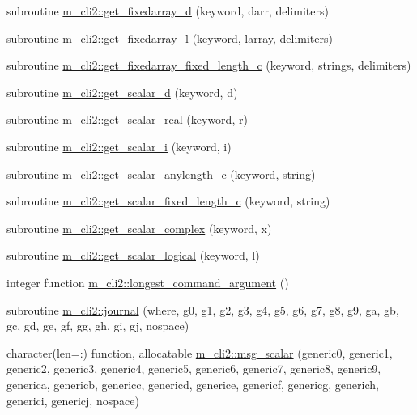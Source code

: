 \begin{DoxyCompactItemize}
\item 
subroutine \mbox{\hyperlink{namespacem__cli2_a2c8db0f383888cb2b3ce8643de3fae93}{m\+\_\+cli2\+::get\+\_\+fixedarray\+\_\+d}} (keyword, darr, delimiters)
\item 
subroutine \mbox{\hyperlink{namespacem__cli2_a65ffe8c7a444db5db3be3f6edecef008}{m\+\_\+cli2\+::get\+\_\+fixedarray\+\_\+l}} (keyword, larray, delimiters)
\item 
subroutine \mbox{\hyperlink{namespacem__cli2_a8000c5e05f6c84ba17350d4a00850a6a}{m\+\_\+cli2\+::get\+\_\+fixedarray\+\_\+fixed\+\_\+length\+\_\+c}} (keyword, strings, delimiters)
\item 
subroutine \mbox{\hyperlink{namespacem__cli2_a338757660adde093db76b7d5559a1906}{m\+\_\+cli2\+::get\+\_\+scalar\+\_\+d}} (keyword, d)
\item 
subroutine \mbox{\hyperlink{namespacem__cli2_ad089d91c66626de91bcda84523e80b54}{m\+\_\+cli2\+::get\+\_\+scalar\+\_\+real}} (keyword, r)
\item 
subroutine \mbox{\hyperlink{namespacem__cli2_a9c5208ef6763da7e68dd1e118bea0b7a}{m\+\_\+cli2\+::get\+\_\+scalar\+\_\+i}} (keyword, i)
\item 
subroutine \mbox{\hyperlink{namespacem__cli2_a7429381c83a021ba3ffb32ed58e17a0e}{m\+\_\+cli2\+::get\+\_\+scalar\+\_\+anylength\+\_\+c}} (keyword, string)
\item 
subroutine \mbox{\hyperlink{namespacem__cli2_a9dcc99d34db1771959a1461274ae073e}{m\+\_\+cli2\+::get\+\_\+scalar\+\_\+fixed\+\_\+length\+\_\+c}} (keyword, string)
\item 
subroutine \mbox{\hyperlink{namespacem__cli2_a2af4dd786acb5cb2dbd6e43667109490}{m\+\_\+cli2\+::get\+\_\+scalar\+\_\+complex}} (keyword, x)
\item 
subroutine \mbox{\hyperlink{namespacem__cli2_a138d07d14246ee532ce36e67719e8c7d}{m\+\_\+cli2\+::get\+\_\+scalar\+\_\+logical}} (keyword, l)
\item 
integer function \mbox{\hyperlink{namespacem__cli2_a7240f12031027172b87fde623bd77958}{m\+\_\+cli2\+::longest\+\_\+command\+\_\+argument}} ()
\item 
subroutine \mbox{\hyperlink{namespacem__cli2_a4c12c311327951984c6e1611da23cdfd}{m\+\_\+cli2\+::journal}} (where, g0, g1, g2, g3, g4, g5, g6, g7, g8, g9, ga, gb, gc, gd, ge, gf, gg, gh, gi, gj, nospace)
\item 
character(len=\+:) function, allocatable \mbox{\hyperlink{namespacem__cli2_a737dc863a63dc101338840baad1cfd17}{m\+\_\+cli2\+::msg\+\_\+scalar}} (generic0, generic1, generic2, generic3, generic4, generic5, generic6, generic7, generic8, generic9, generica, genericb, genericc, genericd, generice, genericf, genericg, generich, generici, genericj, nospace)

\end{DoxyCompactItemize}
